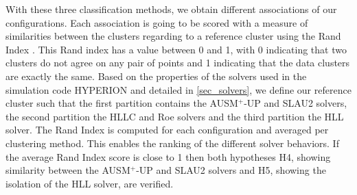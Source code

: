 With these three classification methods, we obtain different associations of our configurations. Each association is going to be scored with a measure of similarities between the clusters regarding to a reference cluster using the Rand Index \cite{rand1971objective}. This Rand index has a value between 0 and 1, with 0 indicating that two clusters do not agree on any pair of points and 1 indicating that the data clusters are exactly the same. Based on the properties of the solvers used in the simulation code HYPERION and detailed in \autoref{sec_solvers}, we define our reference cluster such that the first partition contains the AUSM$^+$-UP and SLAU2 solvers, the second partition the HLLC and Roe solvers and the third partition the HLL solver. The Rand Index is computed for each configuration and averaged per clustering method.
This
enables the
ranking of
the different solver
behaviors.
If the average Rand Index score is close to 1 then both hypotheses H4, showing similarity between the AUSM$^+$-UP and SLAU2 solvers and H5, showing the isolation of the HLL solver, are verified.










